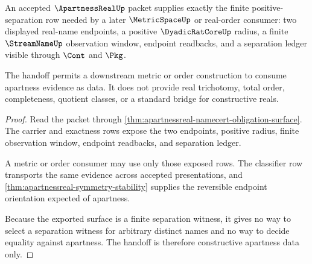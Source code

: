 \begin{theorem}
\label{thm:apartnessreal-metric-handoff}
An accepted $\ApartnessRealUp$ packet supplies exactly the finite positive-separation row needed by a later $\MetricSpaceUp$ or real-order consumer: two displayed real-name endpoints, a positive $\DyadicRatCoreUp$ radius, a finite $\StreamNameUp$ observation window, endpoint readbacks, and a separation ledger visible through $\Cont$ and $\Pkg$.

The handoff permits a downstream metric or order construction to consume apartness evidence as data. It does not provide real trichotomy, total order, completeness, quotient classes, or a standard bridge for constructive reals.
\end{theorem}
\begin{proof}
Read the packet through \autoref{thm:apartnessreal-namecert-obligation-surface}. The carrier and exactness rows expose the two endpoints, positive radius, finite observation window, endpoint readbacks, and separation ledger.

A metric or order consumer may use only those exposed rows. The classifier row transports the same evidence across accepted presentations, and \autoref{thm:apartnessreal-symmetry-stability} supplies the reversible endpoint orientation expected of apartness.

Because the exported surface is a finite separation witness, it gives no way to select a separation witness for arbitrary distinct names and no way to decide equality against apartness. The handoff is therefore constructive apartness data only.
\end{proof}

